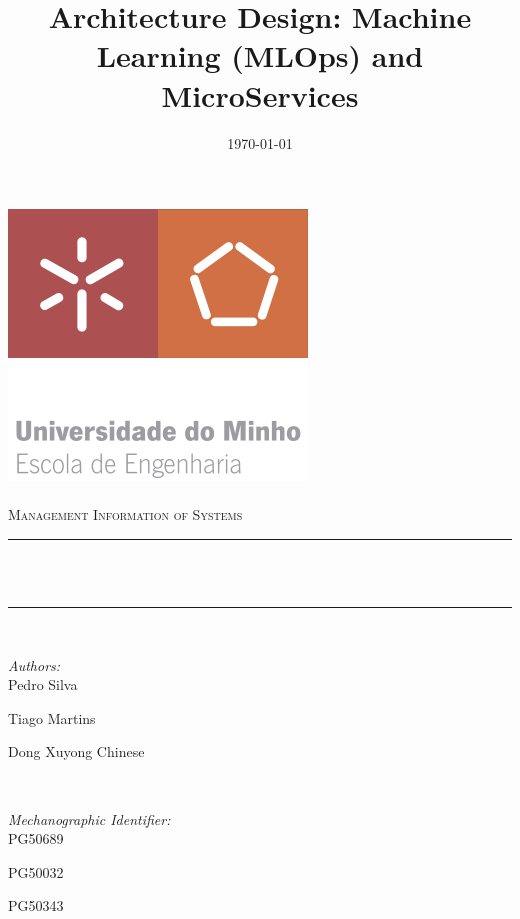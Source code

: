 \documentclass[12pt]{article}
\title{Architecture Design: Machine Learning (MLOps) and MicroServices}								%
\date{\today}											%
\makeatletter
\let\thetitle\@title
\let\thedate\@date
\makeatother
\begin{document}

\begin{titlepage}
	\centering
    \vspace*{0.5 cm}
    \includegraphics[scale = 0.75]{./assets/EEUMLOGO.png}\\[1.0 cm]	%
	\textsc{\Large}\\[0.5 cm]				%
	\textsc{\large Management Information of Systems}\\[0.5 cm]				%
	\rule{\linewidth}{0.2 mm} \\[0.4 cm]
	{ \huge \bfseries \thetitle}\\
	\rule{\linewidth}{0.2 mm} \\[1.5 cm]
	
	\begin{minipage}{0.4\textwidth}
		\begin{flushleft} \large
			\emph{Authors:}\\
			Pedro Silva
   
            Tiago Martins
            
            Dong Xuyong Chinese
			\end{flushleft}
			\end{minipage}~
			\begin{minipage}{0.4\textwidth}
			\begin{flushright} \large
			\emph{Mechanographic Identifier:} \\
			PG50689
   
            PG50032
            
            PG50343%
		\end{flushright}
	\end{minipage}\\[2 cm]
	
	{\large \thedate}\\[2 cm]
 
	\vfill
	
\end{titlepage}
\end{document}
